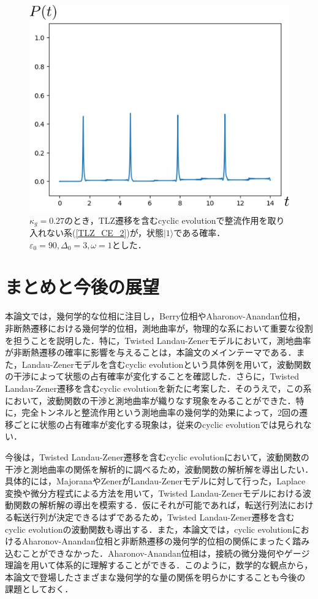 \documentclass[a4paper, titlepage]{jsreport}
\begin{document}
\begin{figure}[htbp]
  \centering
  \includegraphics[scale=0.5]{figures/TLZ_CE_perfect.png}
  \caption{$\kappa_g = 0.27$のとき，TLZ遷移を含むcyclic evolutionで整流作用を取り入れない系(\ref{TLZ_CE_2})が，状態$|1\rangle$である確率．$\varepsilon_0=90, \Delta_0 = 3, \omega=1$とした．}
  \label{fig:TLZ_CE_perfect}
\end{figure}

\chapter{まとめと今後の展望}
本論文では，幾何学的な位相に注目し，Berry位相やAharonov-Anandan位相，非断熱遷移における幾何学的位相，測地曲率が，物理的な系において重要な役割を担うことを説明した．特に，Twisted Landau-Zenerモデルにおいて，測地曲率が非断熱遷移の確率に影響を与えることは，本論文のメインテーマである．また，Landau-Zenerモデルを含むcyclic evolutionという具体例を用いて，波動関数の干渉によって状態の占有確率が変化することを確認した．さらに，Twisted Landau-Zener遷移を含むcyclic evolutionを新たに考案した．そのうえで，この系において，波動関数の干渉と測地曲率が織りなす現象をみることができた．特に，完全トンネルと整流作用という測地曲率の幾何学的効果によって，2回の遷移ごとに状態の占有確率が変化する現象は，従来のcyclic evolutionでは見られない．


今後は，Twisted Landau-Zener遷移を含むcyclic evolutionにおいて，波動関数の干渉と測地曲率の関係を解析的に調べるため，波動関数の解析解を導出したい．具体的には，MajoranaやZenerがLandau-Zenerモデルに対して行った，Laplace変換や微分方程式による方法を用いて，Twisted Landau-Zenerモデルにおける波動関数の解析解の導出を模索する．仮にそれが可能であれば，転送行列法における転送行列が決定できるはずであるため，Twisted Landau-Zener遷移を含むcyclic evolutionの波動関数も導出する．また，本論文では，cyclic evolutionにおけるAharonov-Anandan位相と非断熱遷移の幾何学的位相の関係にまったく踏み込むことができなかった．Aharonov-Anandan位相は，接続の微分幾何やゲージ理論を用いて体系的に理解することができる．このように，数学的な観点から，本論文で登場したさまざまな幾何学的な量の関係を明らかにすることも今後の課題としておく．
\end{document}

